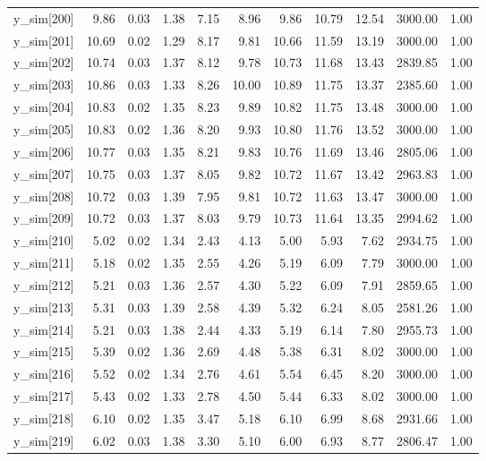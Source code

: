 \begin{table}[ht]
\begin{tabular}{rrrrrrrrrrr}
  y\_sim[200] & 9.86 & 0.03 & 1.38 & 7.15 & 8.96 & 9.86 & 10.79 & 12.54 & 3000.00 & 1.00 \\ 
  y\_sim[201] & 10.69 & 0.02 & 1.29 & 8.17 & 9.81 & 10.66 & 11.59 & 13.19 & 3000.00 & 1.00 \\ 
  y\_sim[202] & 10.74 & 0.03 & 1.37 & 8.12 & 9.78 & 10.73 & 11.68 & 13.43 & 2839.85 & 1.00 \\ 
  y\_sim[203] & 10.86 & 0.03 & 1.33 & 8.26 & 10.00 & 10.89 & 11.75 & 13.37 & 2385.60 & 1.00 \\ 
  y\_sim[204] & 10.83 & 0.02 & 1.35 & 8.23 & 9.89 & 10.82 & 11.75 & 13.48 & 3000.00 & 1.00 \\ 
  y\_sim[205] & 10.83 & 0.02 & 1.36 & 8.20 & 9.93 & 10.80 & 11.76 & 13.52 & 3000.00 & 1.00 \\ 
  y\_sim[206] & 10.77 & 0.03 & 1.35 & 8.21 & 9.83 & 10.76 & 11.69 & 13.46 & 2805.06 & 1.00 \\ 
  y\_sim[207] & 10.75 & 0.03 & 1.37 & 8.05 & 9.82 & 10.72 & 11.67 & 13.42 & 2963.83 & 1.00 \\ 
  y\_sim[208] & 10.72 & 0.03 & 1.39 & 7.95 & 9.81 & 10.72 & 11.63 & 13.47 & 3000.00 & 1.00 \\ 
  y\_sim[209] & 10.72 & 0.03 & 1.37 & 8.03 & 9.79 & 10.73 & 11.64 & 13.35 & 2994.62 & 1.00 \\ 
  y\_sim[210] & 5.02 & 0.02 & 1.34 & 2.43 & 4.13 & 5.00 & 5.93 & 7.62 & 2934.75 & 1.00 \\ 
  y\_sim[211] & 5.18 & 0.02 & 1.35 & 2.55 & 4.26 & 5.19 & 6.09 & 7.79 & 3000.00 & 1.00 \\ 
  y\_sim[212] & 5.21 & 0.03 & 1.36 & 2.57 & 4.30 & 5.22 & 6.09 & 7.91 & 2859.65 & 1.00 \\ 
  y\_sim[213] & 5.31 & 0.03 & 1.39 & 2.58 & 4.39 & 5.32 & 6.24 & 8.05 & 2581.26 & 1.00 \\ 
  y\_sim[214] & 5.21 & 0.03 & 1.38 & 2.44 & 4.33 & 5.19 & 6.14 & 7.80 & 2955.73 & 1.00 \\ 
  y\_sim[215] & 5.39 & 0.02 & 1.36 & 2.69 & 4.48 & 5.38 & 6.31 & 8.02 & 3000.00 & 1.00 \\ 
  y\_sim[216] & 5.52 & 0.02 & 1.34 & 2.76 & 4.61 & 5.54 & 6.45 & 8.20 & 3000.00 & 1.00 \\ 
  y\_sim[217] & 5.43 & 0.02 & 1.33 & 2.78 & 4.50 & 5.44 & 6.33 & 8.02 & 3000.00 & 1.00 \\ 
  y\_sim[218] & 6.10 & 0.02 & 1.35 & 3.47 & 5.18 & 6.10 & 6.99 & 8.68 & 2931.66 & 1.00 \\ 
  y\_sim[219] & 6.02 & 0.03 & 1.38 & 3.30 & 5.10 & 6.00 & 6.93 & 8.77 & 2806.47 & 1.00 \\ 

\end{tabular}
\end{table}
